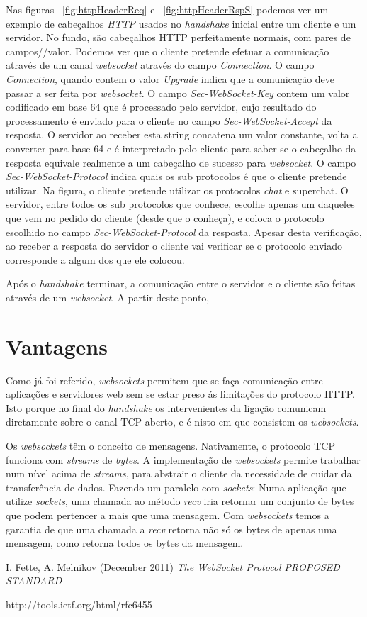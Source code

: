 \documentclass[a4paper]{article}
\begin{document}
Nas figuras ~\ref{fig:httpHeaderReq} e ~\ref{fig:httpHeaderRspS} podemos ver um exemplo de cabeçalhos \emph{HTTP} usados no \emph{handshake} inicial entre um cliente e um servidor. No fundo, são cabeçalhos HTTP perfeitamente normais, com pares de campos//valor. Podemos ver que o cliente pretende efetuar a comunicação através de um canal \emph{websocket} através do campo \emph{Connection}. O campo \emph{Connection}, quando contem o valor \emph{Upgrade} indica que a comunicação deve passar a ser feita por \emph{websocket}.
O campo \emph{Sec-WebSocket-Key} contem um valor codificado em base 64 que é processado pelo servidor, cujo resultado do processamento é enviado para o cliente no campo \emph{Sec-WebSocket-Accept} da resposta. O servidor ao receber esta string concatena um valor constante, volta a converter para base 64 e é interpretado pelo cliente para saber se o cabeçalho da resposta equivale realmente a um cabeçalho de sucesso para \emph{websocket}.
O campo \emph{Sec-WebSocket-Protocol} indica quais os sub protocolos é que o cliente pretende utilizar. Na figura, o cliente pretende utilizar os protocolos \emph{chat} e {superchat}. O servidor, entre todos os sub protocolos que conhece, escolhe apenas um daqueles que vem no pedido do cliente (desde que o conheça), e coloca o protocolo escolhido no campo \emph{Sec-WebSocket-Protocol} da resposta. Apesar desta verificação, ao receber a resposta do servidor o cliente vai verificar se o protocolo enviado corresponde a algum dos que ele colocou.

Após o \emph{handshake} terminar, a comunicação entre o servidor e o cliente são feitas através de um \emph{websocket}. A partir deste ponto, 

\section{Vantagens}

Como já foi referido, \emph{websockets} permitem que se faça comunicação entre aplicações e servidores web sem se estar preso ás limitações do protocolo HTTP. Isto porque no final do \emph{handshake} os intervenientes da ligação comunicam diretamente sobre o canal TCP aberto, e é nisto em que consistem os \emph{websockets}. 

Os \emph{websockets} têm o conceito de mensagens. Nativamente, o protocolo TCP funciona com \emph{streams} de \emph{bytes}. A implementação de \emph{websockets} permite trabalhar num nível acima de \emph{streams}, para abstrair o cliente da necessidade de cuidar da transferência de dados.
Fazendo um paralelo com \emph{sockets}: Numa aplicação que utilize \emph{sockets}, uma chamada ao método \emph{recv} iria retornar um conjunto de bytes que podem pertencer a mais que uma mensagem. Com \emph{websockets} temos a garantia de que uma chamada a \emph{recv} retorna não só os bytes de apenas uma mensagem, como retorna todos os bytes da mensagem.


\clearpage

\begin{thebibliography}{9}
		I. Fette, A. Melnikov (December 2011)
		\emph{The WebSocket Protocol PROPOSED STANDARD}
				
		http://tools.ietf.org/html/rfc6455


\end{thebibliography}
\end{document}
